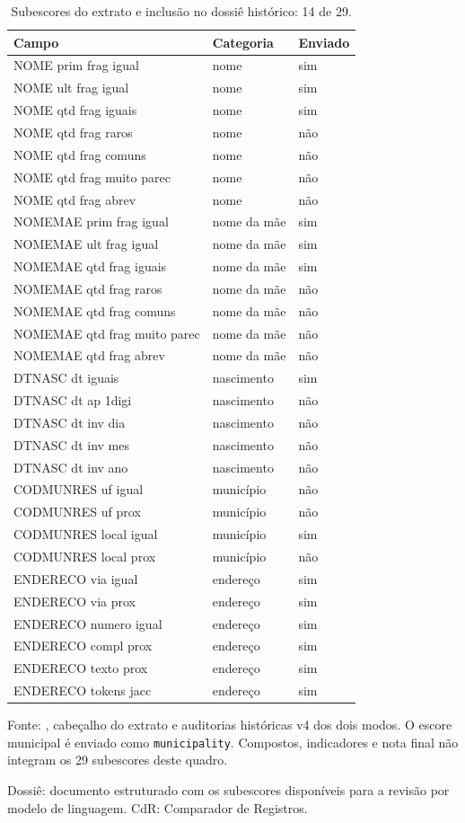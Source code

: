 \begin{table}[htbp]
\centering\scriptsize
\caption{Subescores do extrato e inclusão no dossiê histórico: 14 de 29.}
\label{tab:dossie-campos}
\begin{tabular}{lll}
\toprule
Campo & Categoria & Enviado \\
\midrule
NOME prim frag igual & nome & sim \\
NOME ult frag igual & nome & sim \\
NOME qtd frag iguais & nome & sim \\
NOME qtd frag raros & nome & não \\
NOME qtd frag comuns & nome & não \\
NOME qtd frag muito parec & nome & não \\
NOME qtd frag abrev & nome & não \\
NOMEMAE prim frag igual & nome da mãe & sim \\
NOMEMAE ult frag igual & nome da mãe & sim \\
NOMEMAE qtd frag iguais & nome da mãe & sim \\
NOMEMAE qtd frag raros & nome da mãe & não \\
NOMEMAE qtd frag comuns & nome da mãe & não \\
NOMEMAE qtd frag muito parec & nome da mãe & não \\
NOMEMAE qtd frag abrev & nome da mãe & não \\
DTNASC dt iguais & nascimento & sim \\
DTNASC dt ap 1digi & nascimento & não \\
DTNASC dt inv dia & nascimento & não \\
DTNASC dt inv mes & nascimento & não \\
DTNASC dt inv ano & nascimento & não \\
CODMUNRES uf igual & município & não \\
CODMUNRES uf prox & município & não \\
CODMUNRES local igual & município & sim \\
CODMUNRES local prox & município & não \\
ENDERECO via igual & endereço & sim \\
ENDERECO via prox & endereço & sim \\
ENDERECO numero igual & endereço & sim \\
ENDERECO compl prox & endereço & sim \\
ENDERECO texto prox & endereço & sim \\
ENDERECO tokens jacc & endereço & sim \\
\bottomrule
\end{tabular}
\par\smallskip\parbox{\linewidth}{\footnotesize Fonte: , cabeçalho do extrato e auditorias históricas v4 dos dois modos. O escore municipal é enviado como \texttt{municipality}. Compostos, indicadores e nota final não integram os 29 subescores deste quadro.}
\par\footnotesize Dossiê: documento estruturado com os subescores disponíveis para a revisão por modelo de linguagem. CdR: Comparador de Registros.
\end{table}
